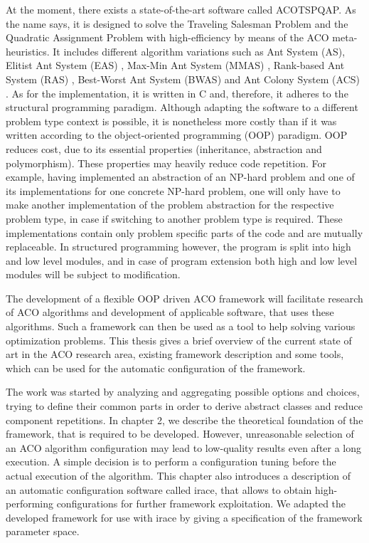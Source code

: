 \documentclass[12pt,a4paper,oneside]{book}
\begin{document}
At the moment, there exists a state-of-the-art software called ACOTSPQAP. As the name says, it is designed to solve the Traveling Salesman Problem and the Quadratic Assignment Problem with high-efficiency by means of the ACO meta-heuristics. It includes different algorithm variations such as Ant System (AS), Elitist Ant System (EAS) \cite{Dor1992:thesis,Dorigo1996}, Max-Min Ant System (MMAS) \cite{STUTZLE2000889}, Rank-based Ant System (RAS) \cite{Bullnheimer97anew}, Best-Worst Ant System (BWAS) \cite{Cordon00anew} and Ant Colony System (ACS) \cite{Dorigo1997}. As for the implementation, it is written in C and, therefore, it adheres to the structural programming paradigm. Although adapting the software to a different problem type context is possible, it is nonetheless more costly than if it was written according to the object-oriented programming (OOP) paradigm. OOP reduces cost, due to its essential properties (inheritance, abstraction and polymorphism). These properties may heavily reduce code repetition. For example, having implemented an abstraction of an NP-hard problem and one of its implementations for one concrete NP-hard problem, one will only have to make another implementation of the problem abstraction for the respective problem type, in case if switching to another problem type is required. These implementations contain only problem specific parts of the code and are mutually replaceable. In structured programming however, the program is split into high and low level modules, and in case of program extension both high and low level modules will be subject to modification.

The development of a flexible OOP driven ACO framework will facilitate research of ACO algorithms and development of applicable software, that uses these algorithms. Such a framework can then be used as a tool to help solving various optimization problems. This thesis gives a brief overview of the current state of art in the ACO research area, existing framework description and some tools, which can be used for the automatic configuration of the framework.

The work was started by analyzing and aggregating possible options and choices, trying to define their common parts in order to derive abstract classes and reduce component repetitions. In chapter 2, we describe the theoretical foundation of the framework, that is required to be developed. However, unreasonable selection of an ACO algorithm configuration may lead to low-quality results even after a long execution. A simple decision is to perform a configuration tuning before the actual execution of the algorithm. This chapter also introduces a description of an automatic configuration software called irace, that allows to obtain high-performing configurations for further framework exploitation. We adapted the developed framework for use with irace by giving a specification of the framework parameter space.
\end{document}
